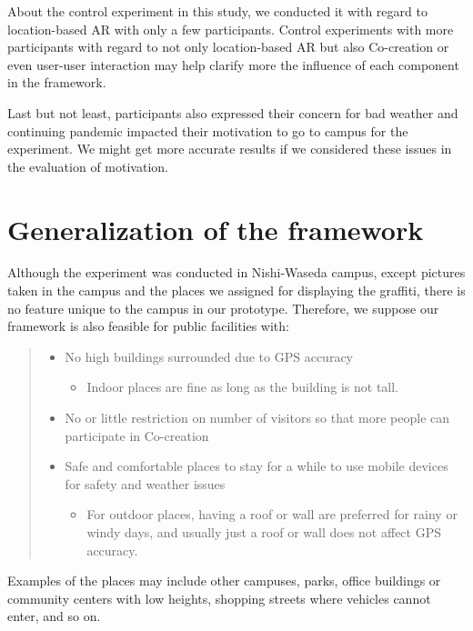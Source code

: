 About the control experiment in this study, we conducted it with regard to location-based AR with only a few participants.
Control experiments with more participants with regard to not only location-based AR but also Co-creation or even user-user interaction may help clarify more the influence of each component in the framework.

Last but not least, participants also expressed their concern for bad weather and continuing pandemic impacted their motivation to go to campus for the experiment.
We might get more accurate results if we considered these issues in the evaluation of motivation.

\section{Generalization of the framework}

Although the experiment was conducted in Nishi-Waseda campus, except pictures taken in the campus and the places we assigned for displaying the graffiti,
there is no feature unique to the campus in our prototype.
Therefore, we suppose our framework is also feasible for public facilities with:
\begin{quote}
  \begin{itemize}
    \item No high buildings surrounded due to GPS accuracy
      \begin{itemize}
        \item Indoor places are fine as long as the building is not tall.
      \end{itemize}
    \item No or little restriction on number of visitors so that more people can participate in Co-creation
    \item Safe and comfortable places to stay for a while to use mobile devices for safety and weather issues
      \begin{itemize}
        \item For outdoor places, having a roof or wall are preferred for rainy or windy days, and usually just a roof or wall does not affect GPS accuracy.
      \end{itemize}
  \end{itemize}
\end{quote}

Examples of the places may include other campuses, parks, office buildings or community centers with low heights, shopping streets where vehicles cannot enter, and so on.